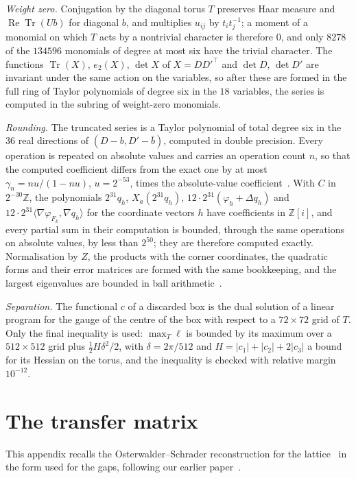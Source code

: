 \documentclass[11pt]{amsart}
\theoremstyle{definition}
\theoremstyle{remark}
\numberwithin{equation}{section}
\newcommand{\Z}{\mathbb{Z}}
\newcommand{\Tr}{\operatorname{Tr}}
\newcommand{\ReTr}{\operatorname{Re}\operatorname{Tr}}
\newcommand{\ip}[2]{\langle #1,#2\rangle}
\begin{document}
\emph{Weight zero.} Conjugation by the diagonal torus $T$ preserves Haar measure
and $\ReTr(Ub)$ for diagonal $b$, and multiplies $u_{ij}$ by $t_it_j^{-1}$; a
moment of a monomial on which $T$ acts by a nontrivial character is therefore
$0$, and only $8278$ of the $134596$ monomials of degree at most six have the
trivial character. The functions $\Tr(X)$, $e_2(X)$, $\det X$ of $X=DD'^\top$
and $\det D$, $\det D'$ are invariant under the same action on the variables,
so after these are formed in the full ring of Taylor polynomials of degree six
in the $18$ variables, the series is computed in the subring of weight-zero
monomials.

\emph{Rounding.} The truncated series is a Taylor polynomial of total degree
six in the $36$ real directions of $(D-b,D'-\bar b)$, computed in double
precision. Every operation is repeated on absolute values and carries an
operation count $n$, so that the computed coefficient differs from the
exact one by at most $\gamma_n=nu/(1-nu)$, $u=2^{-53}$, times the
absolute-value coefficient~\cite[Sec.~3.1]{Hig02}. With $C$ in $2^{-30}\Z$,
the polynomials $2^{31}q_h$, $X_a(2^{31}q_h)$,
$12\cdot2^{31}(\varphi_h+\Delta q_h)$ and $12\cdot2^{31}\ip{\nabla\varphi_{F_k}}
{\nabla q_h}$ for the coordinate vectors $h$ have coefficients in $\Z[i]$, and
every partial sum in their computation is bounded, through the same
operations on absolute values, by less than $2^{50}$; they are therefore
computed exactly. Normalisation by $Z$, the products with the corner
coordinates, the quadratic forms and their error matrices are formed with the
same bookkeeping, and the largest eigenvalues are bounded in ball
arithmetic~\cite{Joh17}.

\emph{Separation.} The functional $c$ of a discarded box is the dual solution
of a linear program for the gauge of the centre of the box with respect to a
$72\times72$ grid of $T$. Only the final inequality is used: $\max_T\ell$ is
bounded by its maximum over a $512\times512$ grid plus $\frac12H\delta^2/2$, with
$\delta=2\pi/512$ and $H=|c_1|+|c_2|+2|c_3|$ a bound for its Hessian on the
torus, and the inequality is checked with relative margin $10^{-12}$.



\section{The transfer matrix}\label{app:transfer}

This appendix recalls the Osterwalder--Schrader reconstruction for the
lattice~\cite{OS73,OS75,OSei78} in the form used for the gaps, following our
earlier paper~\cite{BB26a}.
\end{document}
